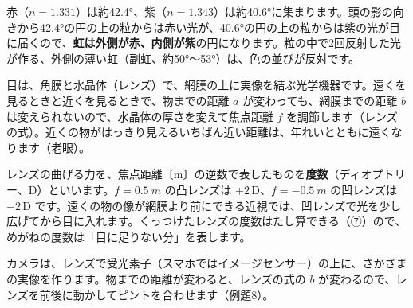 \begin{bkfigure}
\label{ph:波-12:fig-nijikaku}
\end{bkfigure}

\noindent 赤（$n=1.331$）は約\ang{42.4}、紫（$n=1.343$）は約\ang{40.6}に集まります。頭の影の向きから\ang{42.4}の円の上の粒からは赤い光が、\ang{40.6}の円の上の粒からは紫の光が目に届くので、\textbf{虹は外側が赤、内側が紫}の円になります。粒の中で2回反射した光が作る、外側の薄い虹（副虹、約\ang{50}〜\ang{53}）は、色の並びが反対です。

\label{ph:波-12:sec9}

目は、角膜と水晶体（レンズ）で、網膜の上に実像を結ぶ光学機器です。遠くを見るときと近くを見るときで、物までの距離 $a$ が変わっても、網膜までの距離 $b$ は変えられないので、水晶体の厚さを変えて焦点距離 $f$ を調節します（レンズの式）。近くの物がはっきり見えるいちばん近い距離は、年れいとともに遠くなります（老眼）。

レンズの曲げる力を、焦点距離〔m〕の逆数で表したものを\textbf{度数}（ディオプトリー、D）といいます。$f=\qty{0.5}{m}$ の凸レンズは $+2$\,D、$f=\qty{-0.5}{m}$ の凹レンズは $-2$\,D です。遠くの物の像が網膜より前にできる近視では、凹レンズで光を少し広げてから目に入れます。くっつけたレンズの度数はたし算できる（⑦）ので、めがねの度数は「目に足りない分」を表します。

カメラは、レンズで受光素子（スマホではイメージセンサー）の上に、さかさまの実像を作ります。物までの距離が変わると、レンズの式の $b$ が変わるので、レンズを前後に動かしてピントを合わせます（例題8）。

